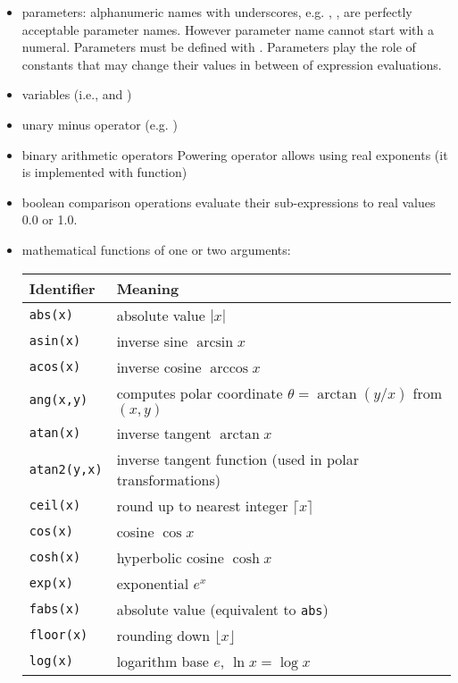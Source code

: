 \begin{itemize}
\item parameters: alphanumeric names with underscores, e.g. ,
,  are perfectly acceptable parameter
names. However parameter name cannot start with a numeral. Parameters must be
defined with . Parameters play the role of
constants that may change their values in between of expression evaluations.

\item variables (i.e.,  and )
\item unary minus operator (e.g. )
\item binary arithmetic operators \inltt{+, -, *, /, \^{}}
   Powering operator allows using real exponents (it is implemented with
    function)
\item boolean comparison operations \inlsh{<, <=, >, >=, ==} evaluate their
sub-expressions to real values 0.0 or 1.0.
\item mathematical functions of one or two arguments:
\begin{center}
\begin{tabular}{ll}
  \toprule
  \textbf{Identifier} & \textbf{Meaning} \\
  \midrule
  \texttt{abs(x)}     & absolute value $|x|$ \\
  \texttt{asin(x)}    & inverse sine $\arcsin x$ \\
  \texttt{acos(x)}    & inverse cosine $\arccos x$ \\
  \texttt{ang(x,y)}   & computes polar coordinate $\theta=\arctan(y/x)$ from $(x,y)$\\
  \texttt{atan(x)}    & inverse tangent $\arctan x$ \\
  \texttt{atan2(y,x)} & inverse tangent function (used in polar transformations) \\
  \texttt{ceil(x)}    & round up to nearest integer $\lceil x\rceil$ \\
  \texttt{cos(x)}     & cosine $\cos x$ \\
  \texttt{cosh(x)}    & hyperbolic cosine $\cosh x$ \\
  \texttt{exp(x)}     & exponential $e^x$ \\
  \texttt{fabs(x)}    & absolute value (equivalent to \texttt{abs}) \\
  \texttt{floor(x)}   & rounding down $\lfloor x\rfloor$ \\
  \texttt{log(x)}     & logarithm base $e$, $\ln x = \log x$ \\

\end{tabular}
\end{center}
\end{itemize}
